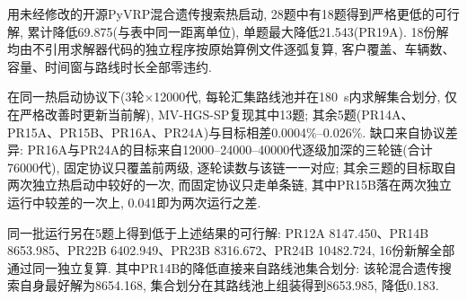 \documentclass{setp-new}
\begin{document}
用未经修改的开源PyVRP混合遗传搜索热启动, 28题中有18题得到严格更低的可行解,
累计降低69.875(与表中同一距离单位), 单题最大降低21.543(PR19A).
18份解均由不引用求解器代码的独立程序按原始算例文件逐弧复算,
客户覆盖、车辆数、容量、时间窗与路线时长全部零违约.

在同一热启动协议下(3轮$\times$12000代, 每轮汇集路线池并在180~s内求解集合划分,
仅在严格改善时更新当前解), MV-HGS-SP复现其中13题;
其余5题(PR14A、PR15A、PR15B、PR16A、PR24A)与目标相差0.0004\%--0.026\%.
缺口来自协议差异: PR16A与PR24A的目标来自12000--24000--40000代逐级加深的三轮链(合计76000代),
固定协议只覆盖前两级, 逐轮读数与该链一一对应;
其余三题的目标取自两次独立热启动中较好的一次, 而固定协议只走单条链,
其中PR15B落在两次独立运行中较差的一次上, 0.041即为两次运行之差.

同一批运行另在5题上得到低于上述结果的可行解:
PR12A 8147.450、PR14B 8653.985、PR22B 6402.949、PR23B 8316.672、PR24B 10482.724,
16份新解全部通过同一独立复算.
其中PR14B的降低直接来自路线池集合划分: 该轮混合遗传搜索自身最好解为8654.168,
集合划分在其路线池上组装得到8653.985, 降低0.183.
\end{document}
